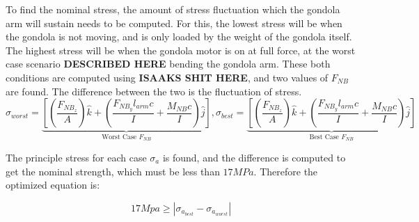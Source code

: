 \documentclass[../main.tex]{subfiles}
\begin{document}
To find the nominal stress, the amount of stress fluctuation which the gondola arm will sustain needs to be computed. For this, the lowest stress will be when the gondola is not moving, and is only loaded by the weight of the gondola itself. The highest stress will be when the gondola motor is on at full force, at the worst case scenario \textbf{DESCRIBED HERE} bending the gondola arm. These both conditions are computed using \textbf{ISAAKS SHIT HERE}, and two values of $F_{NB}$ are found. The difference between the two is the fluctuation of stress.
\begin{equation}
	\sigma_{worst}= \underbrace{\left[\left(\dfrac{F_{NB_{z}}}{A}\right)\hat{k} + \left(\dfrac{F_{NB_{y}}l_{arm}c}{I}  + \dfrac{M_{NB}c}{I} \right) \hat{j}\right]}_\text{Worst Case $F_{NB}$}, \sigma_{best} = \underbrace{\left[\left(\dfrac{F_{NB_{z}}}{A}\right)\hat{k} + \left(\dfrac{F_{NB_{y}}l_{arm}c}{I}  + \dfrac{M_{NB}c}{I} \right) \hat{j}\right]}_\text{Best Case $F_{NB}$}
\end{equation}

The principle stress for each case $\sigma _a$ is found, and the difference is computed to get the nominal strength, which must be less than $17MPa$. Therefore the optimized equation is:

\begin{equation}
	17Mpa \geq \left|\sigma _{a_{best}}-\sigma _{a_{worst}}\right|
\end{equation} 
\end{document}
